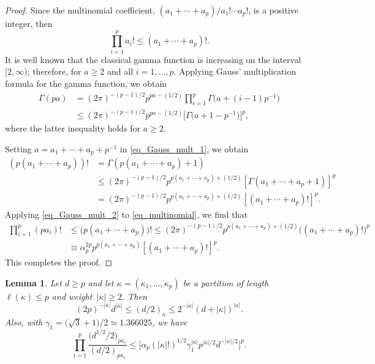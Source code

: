 \documentclass[11pt]{article}
\numberwithin{equation}{section}
\numberwithin{equation}{section}
\newtheorem{Lemma}[Theorem]{Lemma}
\begin{document}
\begin{proof}
Since the multinomial coefficient, $(a_1+\cdots+a_p)/a_1! \cdots a_p!$, is a positive integer, then
\begin{equation}
\label{eq_multinomial}
\prod_{i=1}^p a_i! \le (a_1 + \cdots + a_p)!.
\end{equation}
It is well known that the classical gamma function is increasing on the interval $[2,\infty)$; therefore,
for $a \ge 2$ and all $i=1,\ldots,p$. Applying Gauss' multiplication formula for the gamma function, we obtain
\begin{align}
\Gamma(pa) &= (2\pi)^{-(p-1)/2} p^{pa-(1/2)} \prod_{i=1}^p \Gamma\bigl(a + (i-1)p^{-1}\bigr) \nonumber \\
&\le (2\pi)^{-(p-1)/2} p^{pa-(1/2)} \bigl[\Gamma\bigl(a + 1 - p^{-1}\bigr)\bigr]^p,\label{eq_Gauss_mult_1}
\end{align}
where the latter inequality holds for $a \ge 2$.

Setting $a = a_1+\cdots+a_p + p^{-1}$ in \eqref{eq_Gauss_mult_1}, we obtain
\begin{align}
\label{eq_Gauss_mult_2}
(p (a_1+\cdots+a_p))! &= \Gamma(p (a_1+\cdots+a_p) + 1) \nonumber \\
&\le (2\pi)^{-(p-1)/2} p^{p (a_1+\cdots+a_p) + (1/2)} [\Gamma(a_1+\cdots+a_p+1)]^p \nonumber \\
&= (2\pi)^{-(p-1)/2} p^{p (a_1+\cdots+a_p) + (1/2)} [(a_1+\cdots+a_p)!]^p.
\end{align}
Applying \eqref{eq_Gauss_mult_2} to \eqref{eq_multinomial}, we find that
\begin{align*}
\prod_{i=1}^p (p a_i)! &\le \bigl(p (a_1+\cdots+a_p)\bigr)! \le (2\pi)^{-(p-1)/2} p^{p (a_1+\cdots+a_p) + (1/2)} \bigl((a_1+\cdots+a_p)!\bigr)^p \\
&\equiv \alpha_p^{2p} p^{p(a_1+\cdots+a_p)} [(a_1+\cdots+a_p)!]^p.
\end{align*}
This completes the proof.
\end{proof}



\begin{Lemma}
\label{lemma_ineqs}
Let $d \ge p$ and let $\kappa = (\kappa_1,\ldots,\kappa_p)$ be a partition of length $\ell(\kappa) \le p$ and weight~${|\kappa| \ge 2}$. Then
\begin{equation}
\label{eq_d_kappa_ineq}
(2p)^{-|\kappa|} d^{|\kappa|} \le (d/2)_\kappa \le 2^{-|\kappa|} (d + |\kappa|)^{|\kappa|}.
\end{equation}
Also, with $\gamma_1 = \bigl(\sqrt{3}+1\bigr)/2 \simeq 1.366025$, we have
\begin{equation}
\label{eq_d_kappa_ratio_ineq3}
\prod_{i=1}^p \frac{\bigl(d^{1/2}/2\bigr)_{p \kappa_i}}{(d/2)_{p \kappa_i}} \le \bigl[\alpha_p (|\kappa|!)^{1/2} \gamma_1^{|\kappa|} p^{|\kappa|/2} d^{-|\kappa|/2}\bigr]^p.
\end{equation}
\end{Lemma}
\end{document}
